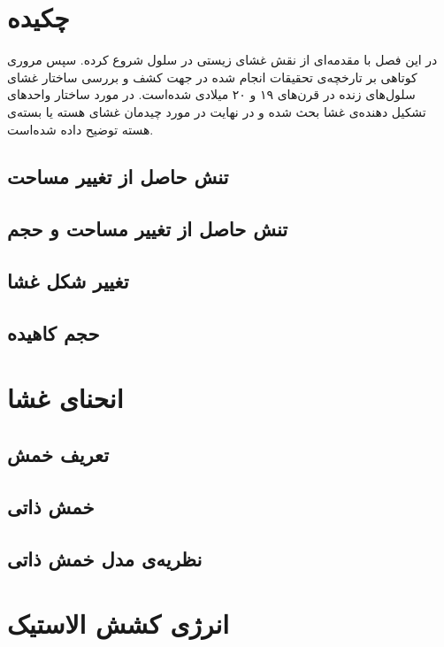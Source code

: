 \setRL
\clearpage

\def \MemTB {\Mempath /MembraneTheoreticalBackground}

\section{
چکیده
}
در این فصل با مقدمه‌ای از نقش غشای زیستی در سلول شروع کرده. سپس مروری کوتاهی بر تارخچه‌ی تحقیقات انجام شده در جهت کشف و بررسی ساختار غشای سلول‌های زنده در قرن‌های ۱۹ و ۲۰ میلادی شده‌است. در مورد ساختار واحد‌های تشکیل دهنده‌ی غشا بحث شده و در نهایت در مورد چیدمان غشای هسته یا بسته‌ی هسته توضیح داده شده‌است.


\subsection{
تنش حاصل از تغییر مساحت
}

\subsection{
تنش حاصل از تغییر مساحت و حجم
}

\subsection{
تغییر شکل غشا
}

\subsection{
حجم کاهیده
}



\section{
انحنای غشا
}
\subsection{
تعریف خمش
}


\subsection{
خمش ذاتی
}


\subsection{
نظریه‌ی مدل خمش ذاتی
\label{sec:spontaneousCurvatureModel}
}



\section{
انرژی کشش الاستیک
}











